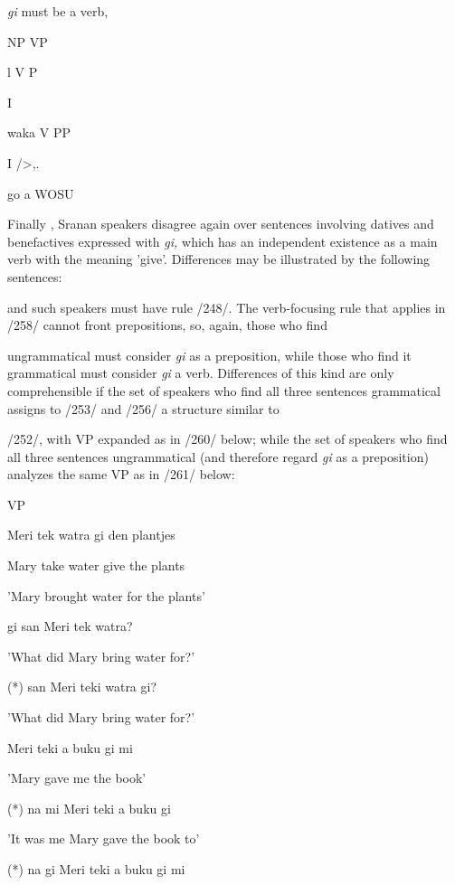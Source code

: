 \textit{gi} must be a verb,

NP VP

l V P

I

waka V PP

I /{\textquotedbl}{\textgreater},.

go a WOSU

Finally , Sranan speakers disagree again over sentences involving datives and benefactives expressed with \textit{gi,} which has an independent existence as a main verb with the meaning 'give'. Differences may be illustrated by the following sentences:

and such speakers must have rule /248/. The verb-focusing rule that applies in /258/ cannot front prepositions, so, again, those who find

\ea\label{ex:258}
 ungrammatical must consider \textit{gi }as a preposition, while those who find it grammatical must consider \textit{gi} a verb. Differences of this kind are only comprehensible if the set of speakers who find all three sentences grammatical assigns to /253/ and /256/ a structure similar to
\glt
\z

/252/, with VP expanded as in /260/ below; while the set of speakers who find all three sentences ungrammatical (and therefore regard \textit{gi} as a preposition) analyzes the same VP as in /261/ below:

\ea\label{ex:260}

\glt
\z

VP

\ea\label{ex:253}
 Meri tek watra gi den plantjes
\glt
\z

Mary take water give the plants

'Mary brought water for the plants'

\ea\label{ex:254}
 gi san Meri tek watra?
\glt
\z

'What did Mary bring water for?'

\ea\label{ex:255}
 (*) san Meri teki watra gi?
\glt
\z

'What did Mary bring water for?'

\ea\label{ex:256}
 Meri teki a buku gi mi
\glt
\z

'Mary gave me the book'

\ea\label{ex:257}
 (*) na mi Meri teki a buku gi
\glt
\z

'It was me Mary gave the book to'

\ea\label{ex:258}
 (*) na gi Meri teki a buku gi mi
\glt
\z


